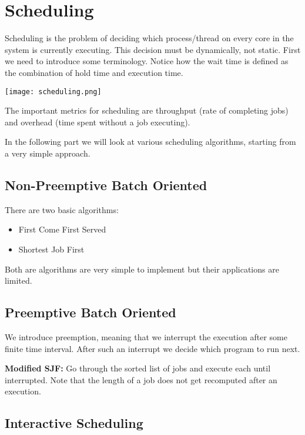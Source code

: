 \section{Scheduling}

Scheduling is the problem of deciding which process/thread on every core in the system is currently executing. This decision must be dynamically, not static. First we need to introduce some terminology. Notice how the wait time is defined as the combination of hold time and execution time.
\begin{center}
	\texttt{[image: scheduling.png]}
\end{center}

The important metrics for scheduling are throughput (rate of completing jobs) and overhead (time spent without a job executing). \medskip

In the following part we will look at various scheduling algorithms, starting from a very simple approach.


\subsection{Non-Preemptive Batch Oriented}

There are two basic algorithms:
\begin{itemize}
	\item First Come First Served
	\item Shortest Job First
\end{itemize}

Both are algorithms are very simple to implement but their applications are limited.


\subsection{Preemptive Batch Oriented}

We introduce preemption, meaning that we interrupt the execution after some finite time interval. After such an interrupt we decide which program to run next. \medskip

\textbf{Modified SJF:} Go through the sorted list of jobs and execute each until interrupted. Note that the length of a job does not get recomputed after an execution.


\subsection{Interactive Scheduling}

